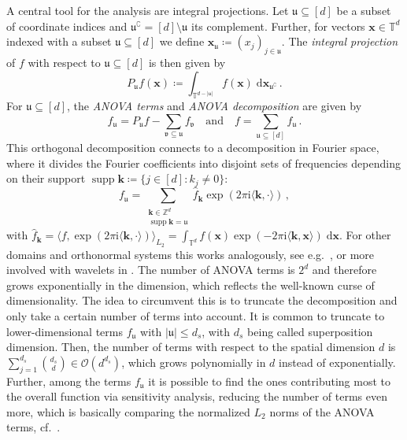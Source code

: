\documentclass[a4paper]{scrartcl}
\numberwithin{equation}{section}
\DeclareMathOperator{\Supp}{supp}
\begin{document}
A central tool for the analysis are integral projections.
Let $\mathfrak u \subseteq [d]$ be a subset of coordinate indices and $\mathfrak u^\complement = [d]\setminus \mathfrak u$ its complement.
Further, for vectors $\bm x\in\mathds T^d$ indexed with a subset $\mathfrak u\subseteq[d]$ we define $\bm x_{\mathfrak u} \coloneqq (x_j)_{j\in \mathfrak u}$.
The \emph{integral projection} of $f$ with respect to $\mathfrak u\subseteq[d]$ is then given by
\begin{equation*}
    P_{\mathfrak u} f(\bm x)
    \coloneqq \int_{\mathds T^{d-|\mathfrak u|}} f(\bm x) \;\mathrm d\bm x_{\mathfrak u^\complement}\, .
\end{equation*}
For $\mathfrak u\subseteq [d]$, the \emph{ANOVA terms} and \emph{ANOVA decomposition} are given by
\begin{equation*}
    f_{\mathfrak u}
    = P_{\mathfrak u} f - \sum_{\mathfrak v\subseteq \mathfrak u} f_{\mathfrak v}
    \quad\text{and}\quad
    f = \sum_{\mathfrak u\subseteq [d]} f_{\mathfrak u} \,.
\end{equation*}
This orthogonal decomposition connects to a decomposition in Fourier space, where it divides the Fourier coefficients into disjoint sets of frequencies depending on their support $\Supp\bm k \coloneqq \{j\in [d] : k_j \neq 0\}$:
\begin{equation*}
    f_{\mathfrak u}
    = \sum_{\substack{\bm k\in\mathds Z^d \\ \Supp \bm k = \mathfrak u}}
    \hat f_{\bm k}
    \exp(2\pi\mathrm i\langle\bm k, \cdot\rangle) \,,
\end{equation*}
with $\hat f_{\bm k} = \langle f, \exp(2\pi\mathrm i\langle\bm k, \cdot\rangle) \rangle_{L_2} = \int_{\mathds T^d} f(\bm x)\exp(-2\pi\mathrm i\langle\bm k, \bm x\rangle)\;\mathrm d\bm x$.
For other domains and orthonormal systems this works analogously, see e.g.~\cite{Schmischke22}, or more involved with wavelets in \cite{LPU21}.
The number of ANOVA terms is $2^d$ and therefore grows exponentially in the dimension, which reflects the well-known curse of dimensionality.
The idea to circumvent this is to truncate the decomposition and only take a certain number of terms into account.
It is common to truncate to lower-dimensional terms $f_{\mathfrak u}$ with $|\mathfrak u| \le d_s$, with $d_s$ being called superposition dimension.
Then, the number of terms with respect to the spatial dimension $d$ is $\sum_{j=1}^{d_s} \binom{d_s}{d} \in \mathcal O(d^{d_s})$, which grows polynomially in $d$ instead of exponentially.
Further, among the terms $f_{\mathfrak u}$ it is possible to find the ones contributing most to the overall function via sensitivity analysis, reducing the number of terms even more, which is basically comparing the normalized $L_2$ norms of the ANOVA terms, cf.~\cite{BPS22,PS22b}.
\end{document}

